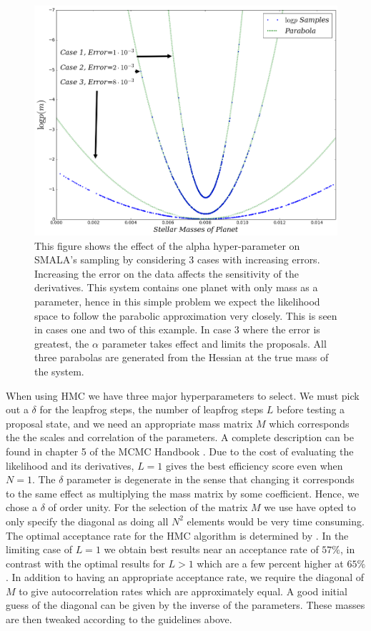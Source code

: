 \documentclass{aa}
\begin{document}
\begin{figure}
\centering
\includegraphics[width=0.95\hsize]{alpha-1.png}
   \caption{This figure shows the effect of the alpha hyper-parameter on SMALA's sampling by considering 3 cases with increasing errors. Increasing the error on the data affects the sensitivity of the derivatives. This system contains one planet with only mass as a parameter, hence in this simple problem we expect the likelihood space to follow the parabolic approximation very closely. This is seen in cases one and two of this example. In case 3 where the error is greatest, the $\alpha$ parameter takes effect and limits the proposals. All three parabolas are generated from the Hessian at the true mass of the system.}
      \label{alpha}
\end{figure}

When using HMC we have three major hyperparameters to select. We must pick out a $\delta$ for the leapfrog steps, the number of leapfrog steps $L$ before testing a proposal state, and we need an appropriate mass matrix $M$ which corresponds the the scales and correlation of the parameters. A complete description can be found in chapter 5 of the MCMC Handbook \cite{1206.1901}. Due to the cost of evaluating the likelihood and its derivatives, $L=1$ gives the best efficiency score even when $N=1$. The $\delta$ parameter is degenerate in the sense that changing it corresponds to the same effect as multiplying the mass matrix by some coefficient. Hence, we chose a $\delta$ of order unity. For the selection of the matrix $M$ we use have opted to only specify the diagonal as doing all $N^2$ elements would be very time consuming. The optimal acceptance rate for the HMC algorithm is determined by \cite{1001.4460}. In the limiting case of $L=1$ we obtain best results near an acceptance rate of $57\%$, in contrast with the optimal results for $L>1$ which are a few percent higher at $65\%$. In addition to having an appropriate acceptance rate, we require the diagonal of $M$ to give autocorrelation rates which are approximately equal. A good initial guess of the diagonal can be given by the inverse of the parameters. These masses are then tweaked according to the guidelines above.
\end{document}
